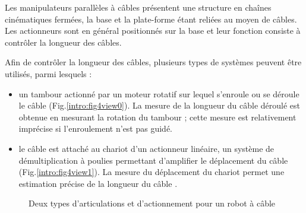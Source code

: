 Les manipulateurs parallèles à câbles présentent une structure en chaînes 
cinéma\-tiques fermées, la base et la plate-forme étant reliées au moyen de 
câbles. Les actionneurs sont en général positionnés sur la base et leur 
fonction 
consiste à contrôler la longueur des câbles.

Afin de contrôler la longueur des câbles, plusieurs types de systèmes peuvent 
être utilisés, parmi lesquels :
\begin{itemize}
 \item un tambour actionné par un moteur rotatif sur lequel s'enroule ou se 
déroule le câble (Fig.\ref{intro:fig4view0}). La mesure de la longueur du câble 
déroulé est obtenue en mesurant la rotation du tambour ; cette mesure est 
relativement imprécise si l'enroulement n'est pas guidé.
 \item le câble est attaché au chariot d'un actionneur linéaire, un système de 
démultiplication à poulies permettant d'amplifier le déplacement du câble 
(Fig.\ref{intro:fig4view1}). La mesure du déplacement du chariot permet une 
estimation précise de la longueur du câble \cite{merlet2008}. 
\end{itemize}

\begin{figure}[!ht]
  \centering
\hfill
    \caption{\footnotesize Deux types d'articulations et d'actionnement pour un 
robot à câble}
\label{intro:fig4}
\end{figure}

